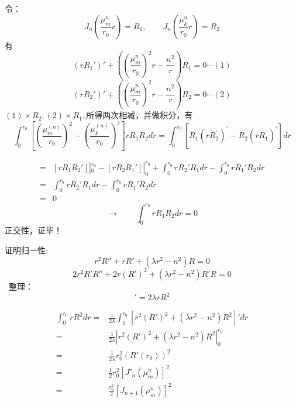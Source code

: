 \begin{frame}
	令：\[J_n (\frac{\mu_{m}^{n}}{r_0}r)=R_1, \qquad J_n (\frac{\mu_{k}^{n}}{r_0}r) =R_2\]
	有
	\begin{equation*}
		(r R_1')' +((\frac{\mu_{m}^{n}}{r_0})^2 r -\frac{n^2}{r})R_1=0  \cdots (1)
	\end{equation*}	 
	\begin{equation*}
		(r R_2')' +((\frac{\mu_{m}^{n}}{r_0})^2 r -\frac{n^2}{r})R_2=0  \cdots (2) 
	\end{equation*}	
	$(1)\times R_2,  (2)\times R_1,$所得两次相减，并做积分，有
	\begin{equation*}	
		\int_0 ^{r_0} \left[\left(\frac{\mu_{m}^{(n)}}{r_0}\right)^{2}-\left(\frac{\mu_{k}^{(n)}}{r_0}\right)^{2}\right] r R_{1} R_{2} dr 
		=\int_0 ^{r_0}  [R_{1}\left(r R_{2}^{\prime}\right)^{\prime}-R_{2}\left(r R_{1}^{\prime}\right)^{\prime}] dr
	\end{equation*}
\end{frame}	

\begin{frame}
	\begin{equation*}
		\begin{split}
			=& [r R_1 R_2']|_0 ^{r_0} - [r R_2 R_1']|_0 ^{r_0} + \int_0 ^{r_0} r R_2' R_1 dr - \int_0 ^{r_0} rR_1' R_2 dr\\
			=& \int_0 ^{r_0} rR_2'R_1 dr - \int_0 ^{r_0} rR_1'R_2 dr\\
			=& 0
		\end{split}
	\end{equation*}	
	\begin{equation*}	
		\to \qquad	\int_0 ^{r_0} r R_{1} R_{2} dr = 0
	\end{equation*}
	正交性，\alert{证毕！}
\end{frame}	

\begin{frame}
	证明归一性:
	\begin{equation*}
		r^2 R''+r R' +(\lambda r^2 -n^2)R=0 
	\end{equation*}	
	\begin{equation*}
		2r^2 R'R''+2r (R')^2 +(\lambda r^2 -n^2)R'R=0 
	\end{equation*}	
	 整理：
	\begin{equation*}
		[r^2 (R')^2 + (\lambda r^2 -n^2)R^2]'=2 \lambda rR^2
	\end{equation*}	
\end{frame}	

\begin{frame}
	\begin{equation*}
		\begin{split}
			\int_0 ^{r_0} r R^2 dr =& \frac{1}{2\lambda} \int_0 ^{r_0} [r^2 (R')^2 + (\lambda r^2 -n^2)R^2]' dr  \\
			=& \frac{1}{2\lambda} |r^2 (R')^2 + (\lambda r^2 -n^2)R^2 |_0 ^{r_0} \\
			=& \frac{1}{2\lambda} r_0^2 (R'(r_0))^2 \\
			=& \frac{1}{2} r_0^2 [J'_n(\mu_m ^n)]^2 \\
			=& \frac{r_0^2}{2} [J_{n+1}(\mu_m ^n)]^2
		\end{split}
	\end{equation*}	
\end{frame}	


